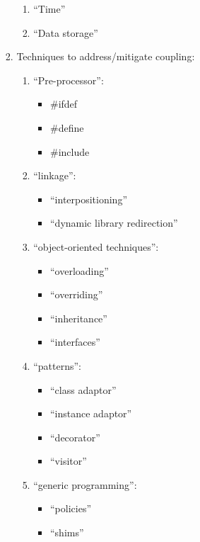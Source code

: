\begin{enumerate}
\begin{enumerate}
\begin{enumerate}
\begin{enumerate}
			\item ``Time''
			\item ``Data storage''
			\end{enumerate}
		\item Techniques to address/mitigate coupling: \vspace{-0.1cm}
			\begin{enumerate} \itemsep -1pt
			\item ``Pre-processor'': \vspace{-0.1cm}
				\begin{itemize} \itemsep -1pt
				\item \#ifdef
				\item \#define
				\item \#include
				\end{itemize}
			\item ``linkage'': \vspace{-0.1cm}
				\begin{itemize} \itemsep -1pt
				\item ``interpositioning''
				\item ``dynamic library redirection''
				\end{itemize}
			\item ``object-oriented techniques'': \vspace{-0.1cm}
				\begin{itemize} \itemsep -1pt
				\item ``overloading''
				\item ``overriding''
				\item ``inheritance''
				\item ``interfaces''
				\end{itemize}
			\item ``patterns'': \vspace{-0.1cm}
				\begin{itemize} \itemsep -1pt
				\item ``class adaptor''
				\item ``instance adaptor''
				\item ``decorator''
				\item ``visitor''
				\end{itemize}
			\item ``generic programming'': \vspace{-0.1cm}
				\begin{itemize} \itemsep -1pt
				\item ``policies''
				\item ``shims''

\end{itemize}
\end{enumerate}
\end{enumerate}
\end{enumerate}
\end{enumerate}

